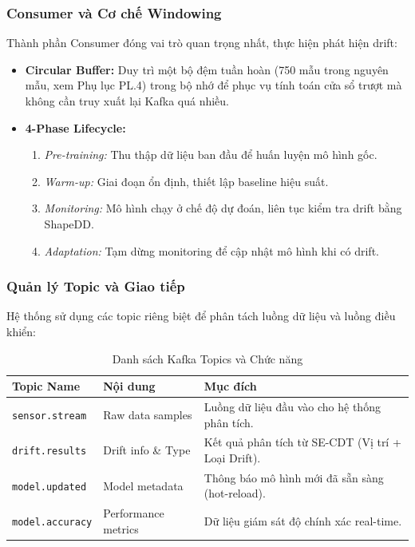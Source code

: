 \subsubsection{Consumer và Cơ chế Windowing}
Thành phần Consumer đóng vai trò quan trọng nhất, thực hiện phát hiện drift:
\begin{itemize}
	\item \textbf{Circular Buffer:} Duy trì một bộ đệm tuần hoàn (750 mẫu trong nguyên mẫu, xem Phụ lục PL.4) trong bộ nhớ để phục vụ tính toán cửa sổ trượt mà không cần truy xuất lại Kafka quá nhiều.
	\item \textbf{4-Phase Lifecycle:}
	      \begin{enumerate}
		      \item \textit{Pre-training:} Thu thập dữ liệu ban đầu để huấn luyện mô hình gốc.
		      \item \textit{Warm-up:} Giai đoạn ổn định, thiết lập baseline hiệu suất.
		      \item \textit{Monitoring:} Mô hình chạy ở chế độ dự đoán, liên tục kiểm tra drift bằng ShapeDD.
		      \item \textit{Adaptation:} Tạm dừng monitoring để cập nhật mô hình khi có drift.
	      \end{enumerate}
\end{itemize}

\subsubsection{Quản lý Topic và Giao tiếp}
Hệ thống sử dụng các topic riêng biệt để phân tách luồng dữ liệu và luồng điều khiển:
\begin{table}[H]
	\centering
	\caption{Danh sách Kafka Topics và Chức năng}
	\label{tab:kafka-topics}
	\begin{tabular}{|l|l|l|}
		\hline
		\textbf{Topic Name}     & \textbf{Nội dung}   & \textbf{Mục đích}                               \\
		\hline
		\texttt{sensor.stream}  & Raw data samples    & Luồng dữ liệu đầu vào cho hệ thống phân tích.   \\
		\hline
		\texttt{drift.results}  & Drift info \& Type  & Kết quả phân tích từ SE-CDT (Vị trí + Loại Drift). \\
		\hline
		\texttt{model.updated}  & Model metadata      & Thông báo mô hình mới đã sẵn sàng (hot-reload). \\
		\hline
		\texttt{model.accuracy} & Performance metrics & Dữ liệu giám sát độ chính xác real-time.        \\
		\hline
	\end{tabular}
\end{table}

